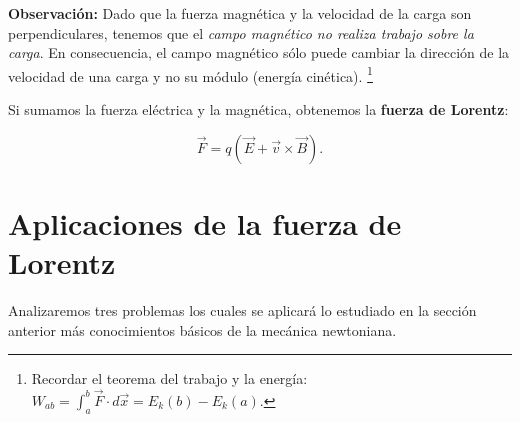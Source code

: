 \textbf{Observación:} Dado que la fuerza magnética y la velocidad de la carga son perpendiculares, tenemos que el \textit{campo magnético no realiza trabajo sobre la carga}. En consecuencia, el campo magnético sólo puede cambiar la dirección de la velocidad de una carga y no su módulo (energía cinética). \footnote{Recordar el teorema del trabajo y la energía: $W_{ab} = \int_a^b \vec{F} \cdot d\vec{x} = E_k(b) - E_k(a)$.}

Si sumamos la fuerza eléctrica y la magnética, obtenemos la \textbf{fuerza de Lorentz}:
\begin{shaded}
    $$\vec{F} = q (\vec{E} + \vec{v} \times \vec{B}).$$
\end{shaded}

\section{Aplicaciones de la fuerza de Lorentz}

Analizaremos tres problemas los cuales se aplicará lo estudiado en la sección anterior más conocimientos básicos de la mecánica newtoniana.

